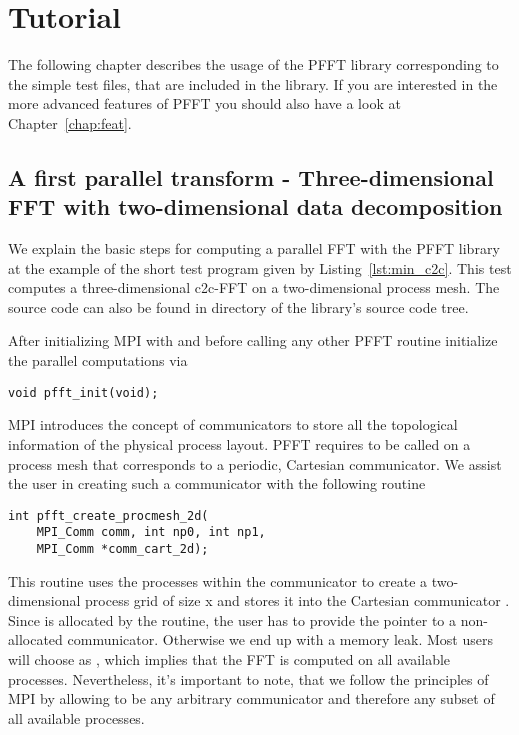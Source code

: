 \chapter{Tutorial}\label{chap:tuto}

The following chapter describes the usage of the PFFT library corresponding to the simple test files,
that are included in the library. If you are interested in the more advanced features of PFFT you
should also have a look at Chapter~\ref{chap:feat}.

\section{A first parallel transform - Three-dimensional FFT with two-dimensional data decomposition}
We explain the basic steps for computing a parallel FFT with the PFFT library at the example
of the short test program given by Listing~\ref{lst:min_c2c}. This test computes a three-dimensional c2c-FFT on
a two-dimensional process mesh. The source code can also be found in directory 
of the library's source code tree. 


After initializing MPI with  and before calling any other PFFT routine initialize
the parallel computations via
\begin{lstlisting}
void pfft_init(void);
\end{lstlisting}
MPI introduces the concept of communicators to store all the topological information of the physical process layout.
PFFT requires to be called on a process mesh that corresponds to a periodic, Cartesian communicator.
We assist the user in creating such a communicator with the following routine
\begin{lstlisting}
int pfft_create_procmesh_2d(
    MPI_Comm comm, int np0, int np1,
    MPI_Comm *comm_cart_2d);
\end{lstlisting}
This routine uses the processes within the communicator  to create a two-dimensional process
grid of size  x  and stores it into the Cartesian communicator .
Since  is allocated by the routine, the user has to provide
the pointer to a non-allocated communicator. Otherwise we end up with a memory leak.
Most users will choose  as , which implies that the FFT is computed
on all available processes. Nevertheless, it's important to note, that we follow the principles of MPI
by allowing  to be any arbitrary communicator and therefore any subset of all available processes.

